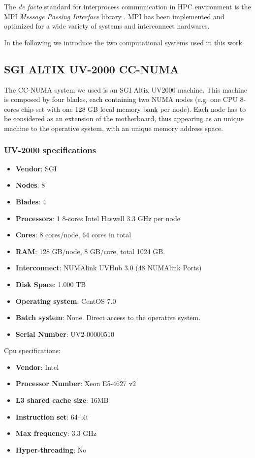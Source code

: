 \documentclass[a4paper,12pt]{article}
\begin{document}
The \textit{de facto} standard for interprocess communication in HPC environment is the MPI \textit{Message Passing Interface} library \cite{MPI}.
MPI has been implemented and optimized for a wide variety of systems and interconnect hardwares.


In the following we introduce the two computational systems used in this work.



\subsection{SGI ALTIX UV-2000 CC-NUMA}\label{numaarch:sec}

The CC-NUMA system we used is an SGI Altix UV2000 machine.
This machine is composed by four blades, each containing two NUMA nodes (e.g. one CPU 8-cores chip-set with one 128 GB local memory bank per node). 
Each node has to be considered as an extension of the motherboard, thus appearing as an unique machine to the operative system, with an unique memory address space.

\subsubsection{UV-2000 specifications}

\begin{itemize}
\item \textbf{Vendor}: SGI
\item \textbf{Nodes}: 8
\item \textbf{Blades}: 4
\item \textbf{Processors}: 1 8-cores Intel Haswell 3.3 GHz per node
\item \textbf{Cores}: 8 cores/node, 64 cores in total
\item \textbf{RAM}: 128 GB/node, 8 GB/core, total 1024 GB.
\item \textbf{Interconnect}: NUMAlink UVHub 3.0 (48 NUMAlink Ports)
\item \textbf{Disk Space}: 1.000 TB
\item \textbf{Operating system}: CentOS 7.0
\item \textbf{Batch system}: None. Direct access to the operative system.
\item \textbf{Serial Number}: UV2-00000510
\end{itemize}

Cpu specifications:

\begin{itemize}
\item \textbf{Vendor}: Intel
\item \textbf{Processor Number}: Xeon E5-4627 v2
\item \textbf{L3 shared cache size}: 16MB
\item \textbf{Instruction set}: 64-bit
\item \textbf{Max frequency}: 3.3 GHz
\item \textbf{Hyper-threading}: No 
\end{itemize}
\end{document}
